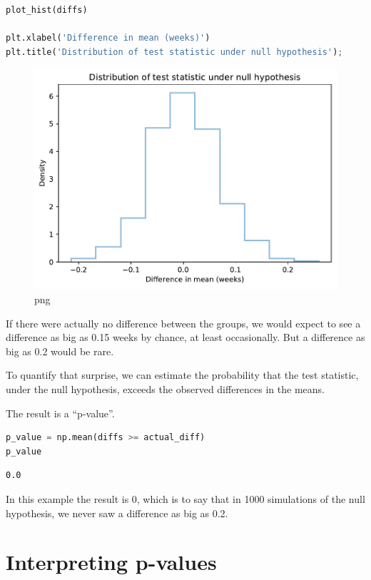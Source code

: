 \begin{lstlisting}[language=Python,style=source]
plot_hist(diffs)

plt.xlabel('Difference in mean (weeks)')
plt.title('Distribution of test statistic under null hypothesis');
\end{lstlisting}

\begin{figure}
\centering
\includegraphics{11_inference_files/11_inference_79_0.pdf}
\caption{png}
\end{figure}

If there were actually no difference between the groups, we would expect
to see a difference as big as 0.15 weeks by chance, at least
occasionally. But a difference as big as 0.2 would be rare.

To quantify that surprise, we can estimate the probability that the test
statistic, under the null hypothesis, exceeds the observed differences
in the means.

The result is a ``p-value''.

\begin{lstlisting}[language=Python,style=source]
p_value = np.mean(diffs >= actual_diff)
p_value
\end{lstlisting}

\begin{lstlisting}[style=output]
0.0
\end{lstlisting}

In this example the result is 0, which is to say that in 1000
simulations of the null hypothesis, we never saw a difference as big as
0.2.

\hypertarget{interpreting-p-values}{%
\section{Interpreting p-values}\label{interpreting-p-values}}


